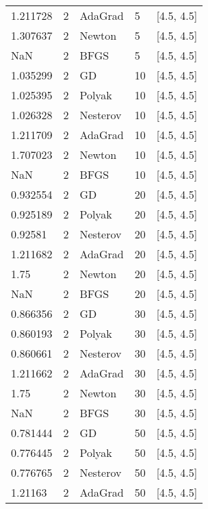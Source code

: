 \begin{tabular}{lllll}
  1.211728 &        2 &  AdaGrad &      5 &       [4.5, 4.5] \\
  1.307637 &        2 &   Newton &      5 &       [4.5, 4.5] \\
       NaN &        2 &     BFGS &      5 &       [4.5, 4.5] \\
  1.035299 &        2 &       GD &     10 &       [4.5, 4.5] \\
  1.025395 &        2 &   Polyak &     10 &       [4.5, 4.5] \\
  1.026328 &        2 & Nesterov &     10 &       [4.5, 4.5] \\
  1.211709 &        2 &  AdaGrad &     10 &       [4.5, 4.5] \\
  1.707023 &        2 &   Newton &     10 &       [4.5, 4.5] \\
       NaN &        2 &     BFGS &     10 &       [4.5, 4.5] \\
  0.932554 &        2 &       GD &     20 &       [4.5, 4.5] \\
  0.925189 &        2 &   Polyak &     20 &       [4.5, 4.5] \\
   0.92581 &        2 & Nesterov &     20 &       [4.5, 4.5] \\
  1.211682 &        2 &  AdaGrad &     20 &       [4.5, 4.5] \\
      1.75 &        2 &   Newton &     20 &       [4.5, 4.5] \\
       NaN &        2 &     BFGS &     20 &       [4.5, 4.5] \\
  0.866356 &        2 &       GD &     30 &       [4.5, 4.5] \\
  0.860193 &        2 &   Polyak &     30 &       [4.5, 4.5] \\
  0.860661 &        2 & Nesterov &     30 &       [4.5, 4.5] \\
  1.211662 &        2 &  AdaGrad &     30 &       [4.5, 4.5] \\
      1.75 &        2 &   Newton &     30 &       [4.5, 4.5] \\
       NaN &        2 &     BFGS &     30 &       [4.5, 4.5] \\
  0.781444 &        2 &       GD &     50 &       [4.5, 4.5] \\
  0.776445 &        2 &   Polyak &     50 &       [4.5, 4.5] \\
  0.776765 &        2 & Nesterov &     50 &       [4.5, 4.5] \\
   1.21163 &        2 &  AdaGrad &     50 &       [4.5, 4.5] \\

\end{tabular}
